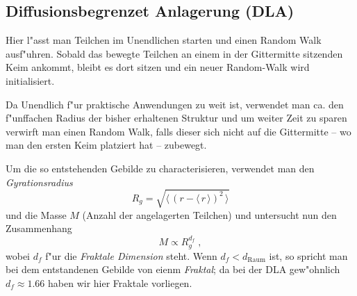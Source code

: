\documentclass[a4paper]{book}
\newcommand{\mittel}[1]{\ensuremath{\langle  \, #1 \,  \rangle}}
\begin{document}
\subsection{Diffusionsbegrenzet Anlagerung (DLA)}
\label{sec:diffusionsbegrenzet_anlagerung_dla}

Hier l"asst man Teilchen im Unendlichen starten und einen Random Walk
ausf"uhren. Sobald das bewegte Teilchen an einem in der Gittermitte
sitzenden Keim ankommt, bleibt es dort sitzen und ein neuer
Random-Walk wird initialisiert.

Da Unendlich f"ur praktische Anwendungen zu weit ist, verwendet man
ca. den f"unffachen Radius der bisher erhaltenen Struktur und um
weiter Zeit zu sparen verwirft man einen Random Walk, falls dieser
sich nicht auf die Gittermitte -- wo man den ersten Keim platziert hat
-- zubewegt.

Um die so entstehenden Gebilde zu characterisieren, verwendet man den
\emph{Gyrationsradius}
\begin{equation*}
  R_g = \sqrt{ \mittel{ ( r - \mittel r )^2 } }
\end{equation*}
und die Masse $M$ (Anzahl der angelagerten Teilchen) und untersucht
nun den Zusammenhang
\begin{equation*}
  M \propto R_g^{d_f} \;,
\end{equation*}
wobei $d_f$ f"ur die \emph{Fraktale Dimension} steht. Wenn $d_f <
d_\text{Raum}$ ist, so spricht man bei dem entstandenen Gebilde von
eienm \emph{Fraktal}; da bei der DLA gew"ohnlich $d_f \approx 1.66$
haben wir hier Fraktale vorliegen.



















\backmatter





% 
% 
% 
% 
\end{document}
